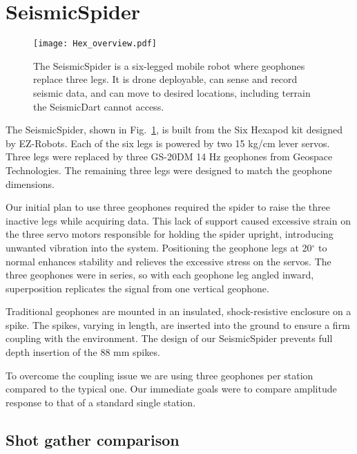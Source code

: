 \section{SeismicSpider}\label{sec:SeismicSpider}


\begin{figure} \centering
  {\texttt{[image: Hex\_overview.pdf]}}
 \caption{The SeismicSpider is a six-legged mobile robot where geophones replace three legs. It is drone deployable, can sense and record seismic data, and can move to desired locations, including terrain the SeismicDart cannot access.} 
 \label{fig:Hex_overview}
\end{figure}


The SeismicSpider, shown in Fig.~\ref{fig:Hex_overview}, is built from the Six Hexapod kit designed by EZ-Robots. Each of the six legs is powered by two 15 kg/cm lever servos. Three legs were replaced by three GS-20DM 14 Hz geophones from Geospace Technologies. The remaining three legs were designed to match the geophone dimensions.

 Our initial plan to use three geophones required the spider to raise the three inactive legs while acquiring data. This lack of support caused excessive strain on the three servo motors responsible for holding the spider upright, introducing unwanted vibration into the system.  Positioning the geophone legs at 20$^\circ$ to normal enhances stability and relieves the excessive stress on the servos. 
 The three geophones were in series, so with each geophone leg angled inward, superposition replicates the signal from one vertical geophone.
 
 Traditional geophones are mounted in an insulated, shock-resistive enclosure on a spike. The spikes, varying in length, are inserted into the ground to ensure a firm coupling with the environment. The design of our SeismicSpider prevents full depth insertion of the 88 mm spikes. 

	To overcome the coupling issue we are using three geophones per station compared to the typical one. Our immediate goals were to compare amplitude response to that of a standard single station.	
 

\subsection{Shot gather comparison}


